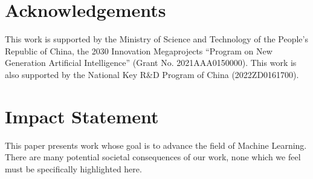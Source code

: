 \documentclass{article}
\theoremstyle{plain}
\theoremstyle{definition}
\theoremstyle{remark}
\begin{document}
\section*{Acknowledgements}

This work is supported by the Ministry of Science and Technology of the People's Republic of China, the 2030 Innovation Megaprojects ``Program on New Generation Artificial Intelligence'' (Grant No. 2021AAA0150000).  This work is also supported by the National Key R\&D Program of China (2022ZD0161700).

\section*{Impact Statement}

This paper presents work whose goal is to advance the field of 
Machine Learning. There are many potential societal consequences of our work, none which we feel must be specifically highlighted here.





\nocite{langley00}





\newpage
\onecolumn
\appendix


\end{document}
